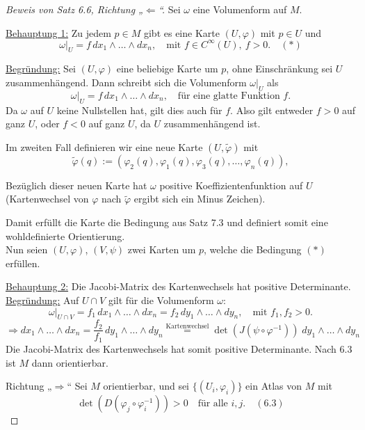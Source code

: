 \documentclass[fleqn, 12pt, letterpaper]{article}
\newcommand{\txt}[1]{\text{#1}}
\begin{document}
\begin{proof}[Beweis von Satz 6.6, Richtung „\(\Leftarrow\)“]  
Sei \( \omega \) eine Volumenform auf \( M \).

\underline{Behauptung 1:}  
Zu jedem \( p \in M \) gibt es eine Karte \( (U, \varphi) \) mit \( p \in U \) und
\[
\omega|_U = f \, dx_1 \wedge \dots \wedge dx_n, \quad \text{mit } f \in C^\infty(U),\ f > 0.  \quad (*)
\]

\underline{Begründung:}  
Sei \( (U, \varphi) \) eine beliebige Karte um \( p \), ohne Einschränkung sei \( U \) zusammenhängend.  
Dann schreibt sich die Volumenform \( \omega|_U \) als
\[
\omega|_U = f \, dx_1 \wedge \dots \wedge dx_n, \quad \text{für eine glatte Funktion } f.
\]
Da \( \omega \) auf \( U \) keine Nullstellen hat, gilt dies auch für \( f \).  
Also gilt entweder \( f > 0 \) auf ganz \( U \), oder \( f < 0 \) auf ganz \( U \), da $U$ zusammenhängend ist.

Im zweiten Fall definieren wir eine neue Karte \( (U, \tilde{\varphi}) \) mit
\[
\tilde{\varphi}(q) := (\varphi_2(q), \varphi_1(q) ,\varphi_3(q), \dots, \varphi_n(q)),
\]

Bezüglich dieser neuen Karte hat \( \omega \) positive Koeffizientenfunktion auf \( U \) (Kartenwechsel von $\varphi$ nach $\tilde{\varphi}$ ergibt sich ein Minus Zeichen).

Damit erfüllt die Karte die Bedingung aus Satz 7.3 und definiert somit eine wohldefinierte Orientierung.\\

Nun seien \( (U, \varphi) \), \( (V, \psi) \) zwei Karten um \( p \), welche die Bedingung \((*)\) erfüllen.

\underline{Behauptung 2:}  
Die Jacobi-Matrix des Kartenwechsels hat positive Determinante.\\

\underline{Begründung:}  
Auf \( U \cap V \) gilt für die Volumenform \( \omega \):
\[
\omega|_{U \cap V} = f_1 \, dx_1 \wedge \dots \wedge dx_n = f_2 \, dy_1 \wedge \dots \wedge dy_n, \quad \text{mit } f_1, f_2 > 0.
\]
\[
\Rightarrow dx_1 \wedge \dots \wedge dx_n = \frac{f_2}{f_1} \, dy_1 \wedge \dots \wedge dy_n \overset{\txt{Kartenwechsel}}{=} \det(J(\psi \circ \varphi^{-1}))\; dy_1 \wedge \dots \wedge dy_n
\]
Die Jacobi-Matrix des Kartenwechsels hat somit positive Determinante. Nach 6.3 ist $M$ dann orientierbar.

\vspace{0.6cm}

Richtung „\(\Rightarrow\)“ 
Sei \( M \) orientierbar, und sei \( \{(U_i, \varphi_i)\} \) ein Atlas von \( M \) mit 
\[
\det\left(D(\varphi_j \circ \varphi_i^{-1})\right) > 0
\quad \text{für alle } i, j. \quad (6.3)
\]


\end{proof}
\end{document}
